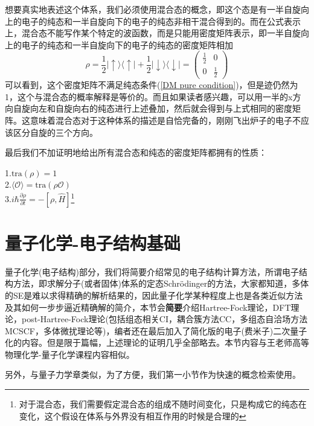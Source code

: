 \documentclass[12pt,a4paper,openany,twoside]{book}
\numberwithin{equation}{section}
\begin{document}
  想要真实地表述这个体系，我们必须使用混合态的概念，即这个态是有一半自旋向上的电子的纯态和一半自旋向下的电子的纯态非相干混合得到的。而在公式表示上，混合态不能写作某个特定的波函数，而是只能用密度矩阵表示，即一半自旋向上的电子的纯态和一半自旋向下的电子的纯态的密度矩阵相加
  \begin{equation}
    \rho = \frac{1}{2} | \uparrow \rangle \langle \uparrow |+\frac{1}{2} | \downarrow \rangle \langle \downarrow |=\left(\begin{array}{ll} {\frac{1}{2}}&{0}\\{0}&{\frac{1}{2}} \end{array}\right)
  \end{equation}
  可以看到，这个密度矩阵不满足纯态条件(\ref{DM pure condition})，但是迹仍然为1，这个与混合态的概率解释是等价的。而且如果读者感兴趣，可以用一半的x方向自旋向左和自旋向右的纯态进行上述叠加，然后就会得到与上式相同的密度矩阵。这意味着混合态对于这种体系的描述是自恰完备的，刚刚飞出炉子的电子不应该区分自旋的三个方向。
  
  最后我们不加证明地给出所有混合态和纯态的密度矩阵都拥有的性质：\\
  \begin{center}
    1.$\text{tra}(\rho)=1$\\
    2.$\langle\mathcal{O}\rangle=\text{tra}(\rho \mathcal{O})$\\
    3.$i \hbar \frac{\partial \rho}{\partial t}=-\left[\rho,\hat{H}\right]$\footnote{对于混合态，我们需要假定混合态的组成不随时间变化，只是构成它的纯态在变化，这个假设在体系与外界没有相互作用的时候是合理的}
  \end{center}
  

  \chapter{量子化学-电子结构基础}
    量子化学(电子结构)部分，我们将简要介绍常见的电子结构计算方法，所谓电子结构方法，即求解分子(或者固体)体系的定态Schr\"odinger的方法，大家都知道，多体的SE是难以求得精确的解析结果的，因此量子化学某种程度上也是各类近似方法及其如何一步步逼近精确解的简介，本节会{\color{red}\textbf{简要}}介绍Hartree-Fock理论，DFT理论，post-Hartree-Fock理论(包括组态相关CI，耦合簇方法CC，多组态自洽场方法MCSCF，多体微扰理论等)，编者还在最后加入了简化版的电子(费米子)二次量子化的内容。但是限于篇幅，上述理论的证明几乎全部略去。本节内容与王老师高等物理化学-量子化学课程内容相似。
    
    另外，与量子力学章类似，为了方便，我们第一小节作为快速的概念检索使用。
\end{document}
